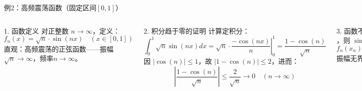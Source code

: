 \begin{frame}{例2：高频震荡函数（固定区间$[0,1]$）}
  \begin{columns}
    \begin{block}{1. 函数定义}
      对正整数 $n \to \infty$，定义：
      \[
      f_n(x) = \sqrt{n} \cdot \sin(nx) \quad (x \in [0,1])
      \]
      直观：高频震荡的正弦函数——振幅$\sqrt{n} \to \infty$，频率$n \to \infty$。
    \end{block}

    \begin{block}{2. 积分趋于零的证明}
      计算定积分：
      \[
      \int_0^1 \sqrt{n}\sin(nx)dx = \sqrt{n} \cdot \left. \frac{-\cos(nx)}{n} \right|_0^1 = \frac{1 - \cos(n)}{\sqrt{n}}
      \]
      因 $|\cos(n)| \leq 1$，故 $|1 - \cos(n)| \leq 2$，进而：
      \[
      \left| \frac{1 - \cos(n)}{\sqrt{n}} \right| \leq \frac{2}{\sqrt{n}} \to 0 \quad (n \to \infty)
      \]
    \end{block}

    \begin{block}{3. 函数不趋于零的原因}
      取 $x_n = \frac{\pi}{2n}$，则 $\sin(nx_n) = 1$，故：
      \[
      f_n(x_n) = \sqrt{n} \to \infty \quad (n \to \infty)
      \]
      振幅无界，函数不趋于零。
    \end{block}
  \end{columns}
\end{frame}

